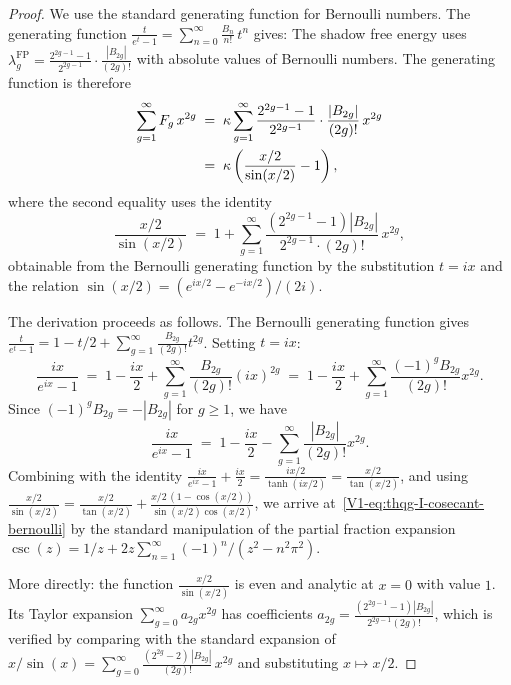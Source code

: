 \begin{proof}
We use the standard generating function for Bernoulli numbers. The generating function $\frac{t}{e^t - 1} = \sum_{n=0}^{\infty} \frac{B_n}{n!}\,t^n$ gives: The shadow free energy uses $\lambda_g^{\mathrm{FP}} = \frac{2^{2g-1}-1}{2^{2g-1}}\cdot\frac{|B_{2g}|}{(2g)!}$ with absolute values of Bernoulli numbers. The generating function is therefore
\begin{align}
\sum_{g=1}^{\infty} F_g\,x^{2g} &\;=\; \kappa \sum_{g=1}^{\infty} \frac{2^{2g-1}-1}{2^{2g-1}} \cdot \frac{|B_{2g}|}{(2g)!}\,x^{2g} \notag\\
&\;=\; \kappa \left( \frac{x/2}{\sin(x/2)} - 1 \right), %
\end{align}
where the second equality uses the identity
\begin{equation}%
\frac{x/2}{\sin(x/2)} \;=\; 1 + \sum_{g=1}^{\infty} \frac{(2^{2g-1}-1)|B_{2g}|}{2^{2g-1}\cdot(2g)!}\,x^{2g},
\end{equation}
obtainable from the Bernoulli generating function by the substitution $t = ix$ and the relation $\sin(x/2) = (e^{ix/2} - e^{-ix/2})/(2i)$.

The derivation proceeds as follows. The Bernoulli generating function gives $\frac{t}{e^t - 1} = 1 - t/2 + \sum_{g=1}^\infty \frac{B_{2g}}{(2g)!} t^{2g}$. Setting $t = ix$:
\[
\frac{ix}{e^{ix} - 1} \;=\; 1 - \frac{ix}{2} + \sum_{g=1}^\infty \frac{B_{2g}}{(2g)!}(ix)^{2g} \;=\; 1 - \frac{ix}{2} + \sum_{g=1}^\infty \frac{(-1)^g B_{2g}}{(2g)!} x^{2g}.
\]
Since $(-1)^g B_{2g} = -|B_{2g}|$ for $g \geq 1$, we have
\[
\frac{ix}{e^{ix}-1} \;=\; 1 - \frac{ix}{2} - \sum_{g=1}^\infty \frac{|B_{2g}|}{(2g)!}x^{2g}.
\]
Combining with the identity $\frac{ix}{e^{ix}-1} + \frac{ix}{2} = \frac{ix/2}{\tanh(ix/2)} = \frac{x/2}{\tan(x/2)}$, and using $\frac{x/2}{\sin(x/2)} = \frac{x/2}{\tan(x/2)} + \frac{x/2\,(1-\cos(x/2))}{\sin(x/2)\cos(x/2)}$, we arrive at~\eqref{V1-eq:thqg-I-cosecant-bernoulli} by the standard manipulation of the partial fraction expansion $\csc(z) = 1/z + 2z\sum_{n=1}^\infty (-1)^n/(z^2 - n^2\pi^2)$.

More directly: the function $\frac{x/2}{\sin(x/2)}$ is even and analytic at $x = 0$ with value $1$. Its Taylor expansion $\sum_{g=0}^\infty a_{2g} x^{2g}$ has coefficients $a_{2g} = \frac{(2^{2g-1}-1)|B_{2g}|}{2^{2g-1}(2g)!}$, which is verified by comparing with the standard expansion of $x/\sin(x) = \sum_{g=0}^\infty \frac{(2^{2g}-2)\,|B_{2g}|}{(2g)!}\, x^{2g}$ and substituting $x \mapsto x/2$.
\end{proof}

